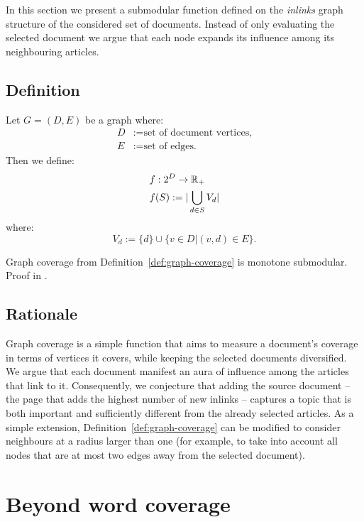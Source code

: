In this section we present a submodular function defined on the \emph{inlinks}
graph structure of the considered set of documents. Instead of only evaluating
the selected document we argue that each node expands its influence among its
neighbouring articles.

\subsection{Definition}

\begin{definition}
  \label{def:graph-coverage}
  Let \(G = (D, E)\) be a graph where:
  \begin{align*}
    D &:= \text{set of document vertices,} \\
    E &:= \text{set of edges.}
  \end{align*}
  Then we define:
  \begin{align*}
    &f : 2^D \to \mathbb{R}_+ \\
    &f(S) := |\bigcup_{d \in S} V_d|
  \end{align*}
  where:
    \[V_d := \{d\} \cup \{v \in D | (v, d) \in E\} \text{.}\]
\end{definition}

\begin{proposition}
  \label{prop:graph-coverage}
  Graph coverage from Definition~\ref{def:graph-coverage} is monotone
  submodular. Proof in .
\end{proposition}

\subsection{Rationale}

Graph coverage is a simple function that aims to measure a document's coverage
in terms of vertices it covers, while keeping the selected documents
diversified.
We argue that each document manifest an aura of influence among the articles
that link to it.
Consequently, we conjecture that adding the source document -- the page
that adds the highest number of new inlinks -- captures a topic that is both
important and sufficiently different from the already selected articles.
As a simple extension, Definition~\vref{def:graph-coverage} can be modified to
consider neighbours at a radius larger than one (for example, to take into
account all nodes that are at most two edges away from the selected document).

\section{Beyond word coverage}

